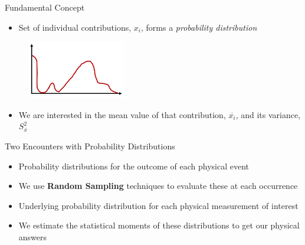 \documentclass[xcolor=x11names,compress]{beamer}
\renewcommand{\(}{\begin{columns}}
\renewcommand{\)}{\end{columns}}
\newcommand{\<}[1]{\begin{column}{#1}}
\renewcommand{\>}{\end{column}}
\begin{document}
\begin{frame}{Fundamental Concept}

\begin{itemize}
  \item Set of individual contributions, ${x_i}$,
forms a \textit{probability distribution}
\end{itemize}
  	\begin{figure}
  	\begin{center}
  		\includegraphics[height=1in,clip]{pdf}
	\end{center}
  	\end{figure}

\begin{itemize}
  \item We are interested in the mean value of that contribution, $\overline{x_i}$, and its variance, $S_{\overline{x}}^2$
\end{itemize}

\end{frame}


\begin{frame}{Two Encounters with Probability Distributions}

\begin{itemize}
    \item Probability distributions for the outcome
of each physical event
    \item We use \textbf{Random Sampling} techniques to
evaluate these at each occurrence
    \item Underlying probability distribution for
each physical measurement of interest
    \item We estimate the statistical moments of
these distributions to get our physical
answers
\end{itemize}
\end{frame}
\end{document}
